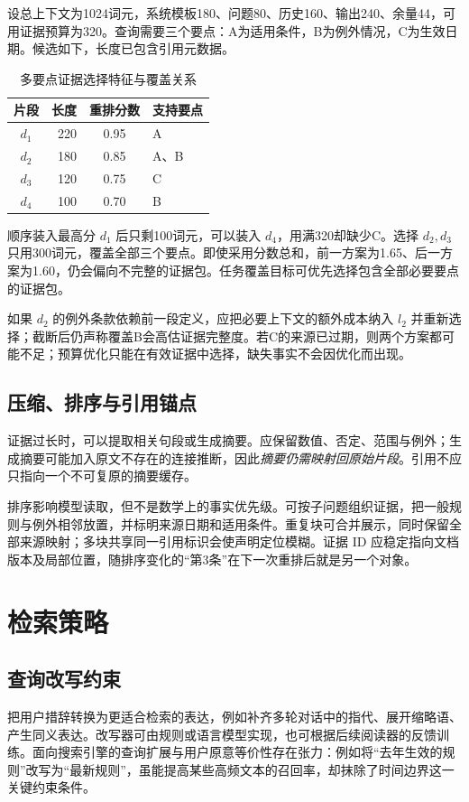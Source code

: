 \documentclass[../textbook.tex]{subfiles}
\begin{document}
\begin{example}


设总上下文为1024词元，系统模板180、问题80、历史160、输出240、余量44，可用证据预算为320。查询需要三个要点：A为适用条件，B为例外情况，C为生效日期。候选如下，长度已包含引用元数据。
\begin{table}[htbp]
\centering
\caption{多要点证据选择特征与覆盖关系}
\label{tab:rag-example-candidates}
\begin{tabular}{crcl}
\toprule
片段 & 长度 & 重排分数 & 支持要点\\
\midrule
$d_1$ &220&0.95&A\\
$d_2$ &180&0.85&A、B\\
$d_3$ &120&0.75&C\\
$d_4$ &100&0.70&B\\
\bottomrule
\end{tabular}
\end{table}
顺序装入最高分 $d_1$ 后只剩100词元，可以装入 $d_4$，用满320却缺少C。选择 $d_2,d_3$ 只用300词元，覆盖全部三个要点。即使采用分数总和，前一方案为1.65、后一方案为1.60，仍会偏向不完整的证据包。任务覆盖目标可优先选择包含全部必要要点的证据包。

如果 $d_2$ 的例外条款依赖前一段定义，应把必要上下文的额外成本纳入 $l_2$ 并重新选择；截断后仍声称覆盖B会高估证据完整度。若C的来源已过期，则两个方案都可能不足；预算优化只能在有效证据中选择，缺失事实不会因优化而出现。
\end{example}

\subsection{压缩、排序与引用锚点}
证据过长时，可以提取相关句段或生成摘要。应保留数值、否定、范围与例外；生成摘要可能加入原文不存在的连接推断，因此\emph{摘要仍需映射回原始片段}。引用不应只指向一个不可复原的摘要缓存。

排序影响模型读取，但不是数学上的事实优先级。可按子问题组织证据，把一般规则与例外相邻放置，并标明来源日期和适用条件。重复块可合并展示，同时保留全部来源映射；多块共享同一引用标识会使声明定位模糊。证据 ID 应稳定指向文档版本及局部位置，随排序变化的“第3条”在下一次重排后就是另一个对象。


\section{检索策略}
\optional
\subsection{查询改写约束}
把用户措辞转换为更适合检索的表达，例如补齐多轮对话中的指代、展开缩略语、产生同义表达。改写器可由规则或语言模型实现，也可根据后续阅读器的反馈训练\cite{ma2023queryrewrite}。面向搜索引擎的查询扩展与用户原意等价性存在张力：例如将“去年生效的规则”改写为“最新规则”，虽能提高某些高频文本的召回率，却抹除了时间边界这一关键约束条件。
\end{document}
